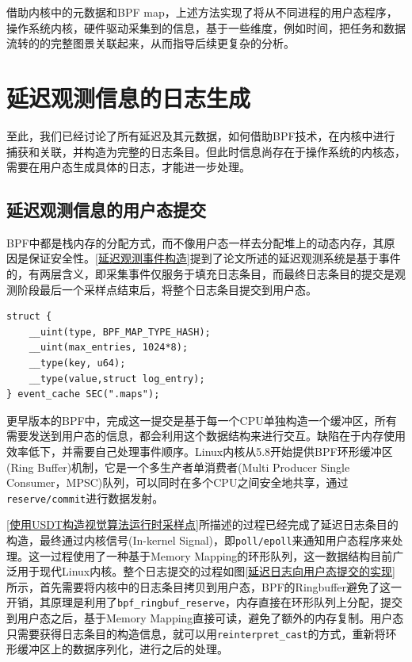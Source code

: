 \documentclass[master]{shtthesis}
\begin{document}
借助内核中的元数据和BPF map，上述方法实现了将从不同进程的用户态程序，操作系统内核，硬件驱动采集到的信息，基于一些维度，例如时间，把任务和数据流转的的完整图景关联起来，从而指导后续更复杂的分析。

\section{延迟观测信息的日志生成}\label{延迟观测信息的日志生成}
至此，我们已经讨论了所有延迟及其元数据，如何借助BPF技术，在内核中进行捕获和关联，并构造为完整的日志条目。但此时信息尚存在于操作系统的内核态，需要在用户态生成具体的日志，才能进一步处理。
\subsection{延迟观测信息的用户态提交}
BPF中都是栈内存的分配方式，而不像用户态一样去分配堆上的动态内存，其原因是保证安全性。\ref{延迟观测事件构造}提到了论文所述的延迟观测系统是基于事件的，有两层含义，即采集事件仅服务于填充日志条目，而最终日志条目的提交是观测阶段最后一个采样点结束后，将整个日志条目提交到用户态。
\begin{lstlisting}[caption={日志条目保存map},captionpos=b]
struct {
	__uint(type, BPF_MAP_TYPE_HASH);
	__uint(max_entries, 1024*8);
	__type(key, u64);
	__type(value,struct log_entry);
} event_cache SEC(".maps");
\end{lstlisting}

更早版本的BPF中，完成这一提交是基于每一个CPU单独构造一个缓冲区，所有需要发送到用户态的信息，都会利用这个数据结构来进行交互。缺陷在于内存使用效率低下，并需要自己处理事件顺序。Linux内核从5.8开始提供BPF环形缓冲区(Ring Buffer)\cite{bpfring}机制，它是一个多生产者单消费者(Multi Producer Single Consumer，MPSC)队列，可以同时在多个CPU之间安全地共享，通过\verb*|reserve/commit|进行数据发射。

\ref{使用USDT构造视觉算法运行时采样点}所描述的过程已经完成了延迟日志条目的构造，最终通过内核信号(In-kernel Signal)，即\verb*|poll/epoll|来通知用户态程序来处理。这一过程使用了一种基于Memory Mapping的环形队列，这一数据结构目前广泛用于现代Linux内核。整个日志提交的过程如图\ref{延迟日志向用户态提交的实现}所示，首先需要将内核中的日志条目拷贝到用户态，BPF的Ringbuffer避免了这一开销，其原理是利用了\verb*|bpf_ringbuf_reserve|，内存直接在环形队列上分配，提交到用户态之后，基于Memory Mapping直接可读，避免了额外的内存复制。用户态只需要获得日志条目的构造信息，就可以用\verb*|reinterpret_cast|的方式，重新将环形缓冲区上的数据序列化，进行之后的处理。
\end{document}
